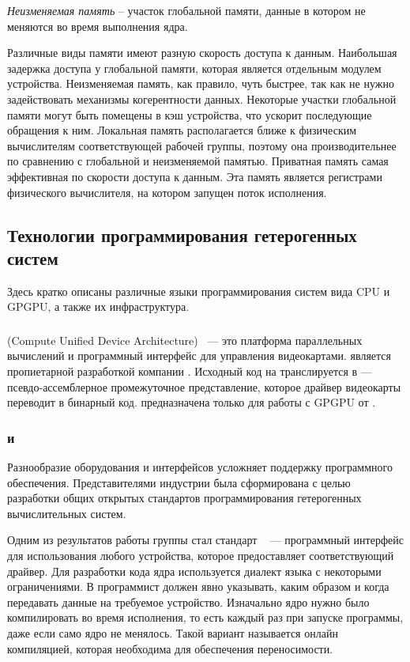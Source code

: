 \emph{Неизменяемая память} -- участок глобальной памяти, данные в котором не меняются во время выполнения ядра.

Различные виды памяти имеют разную скорость доступа к данным.
Наибольшая задержка доступа у глобальной памяти, которая является отдельным модулем устройства.
Неизменяемая память, как правило, чуть быстрее, так как не нужно задействовать
механизмы когерентности данных.
Некоторые участки глобальной памяти могут быть помещены в кэш устройства, что ускорит последующие обращения к ним.
Локальная память располагается ближе к физическим вычислителям соответствующей 
рабочей группы, поэтому она производительнее по сравнению с глобальной и 
неизменяемой памятью.
Приватная память самая эффективная по скорости доступа к данным.
Эта память является регистрами физического вычислителя, на котором запущен 
поток исполнения.

\subsection[Технологии программирования гетерогенных систем] {Технологии
программирования гетерогенных\\ систем}
Здесь кратко описаны различные языки программирования систем вида 
CPU и GPGPU, а также их инфраструктура.

\subsubsection{}
 (Compute Unified Device Architecture)~\cite{CUDA} --- 
это платформа параллельных вычислений и программный интерфейс 
для управления видеокартами.
 является пропиетарной разработкой компании .
Исходный код на  транслируется в  ---
псевдо-ассемблерное промежуточное представление, 
которое драйвер видеокарты переводит в бинарный код.
 предназначена только для работы с GPGPU от .

\subsubsection{ и }
Разнообразие оборудования и интерфейсов усложняет поддержку
программного обеспечения.
Представителями индустрии была сформирована  с целью
разработки общих открытых стандартов программирования гетерогенных
вычислительных систем.

Одним из результатов работы группы стал стандарт 
~\cite{OpenCL} --- программный интерфейс для использования любого
устройства, которое предоставляет соответствующий драйвер.
Для разработки кода ядра используется диалект
языка  с некоторыми ограничениями.
В  программист должен явно указывать, каким образом и когда
передавать данные на требуемое устройство.
Изначально ядро нужно было компилировать во время исполнения, 
то есть каждый раз при запуске программы, даже если само ядро не менялось.
Такой вариант называется онлайн компиляцией, которая необходима для 
обеспечения переносимости.

